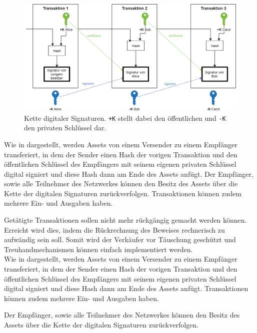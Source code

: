     \begin{figure}[!htb]
    	\centering
    	\includegraphics[width=\textwidth]{graphics/transaction.png}
    	\caption[Kette digitaler Signaturen]{Kette digitaler Signaturen\cite{Nakamoto2008}. \lstinline{+K} stellt dabei den öffentlichen und \lstinline{-K} den privaten Schlüssel dar.}
    	\label{fig:txio}
    \end{figure}
    Wie in  dargestellt, werden Assets von einem Versender zu einem Empfänger transferiert, in dem der Sender einen Hash der vorigen Transaktion und den öffentlichen Schlüssel des Empfängers mit seinem eigenen privaten Schlüssel digital signiert und diese Hash dann am Ende des Assets anfügt.
    Der Empfänger, sowie alle Teilnehmer des Netzwerkes können den Besitz des Assets über die Kette der digitalen Signaturen zurückverfolgen.
    Transaktionen können zudem mehrere Ein- und Ausgaben haben.\cite{Nakamoto2008}
    
    Getätigte Transaktionen sollen nicht mehr rückgängig gemacht werden können.
    Erreicht wird dies, indem die Rückrechnung des Beweises rechnerisch zu aufwändig sein soll\cite{Nakamoto2008}.
    Somit wird der Verkäufer vor Täuschung geschützt und Treuhandmechanismen können einfach implementiert werden\cite{Nakamoto2008}.  
    \medskip\\
    Wie in  dargestellt, werden Assets von einem Versender zu einem Empfänger transferiert, in dem der Sender einen Hash der vorigen Transaktion und den öffentlichen Schlüssel des Empfängers mit seinem eigenen privaten Schlüssel digital signiert und diese Hash dann am Ende des Assets anfügt.
    Transaktionen können zudem mehrere Ein- und Ausgaben haben\cite{Nakamoto2008}.
    
    Der Empfänger, sowie alle Teilnehmer des Netzwerkes können den Besitz des Assets über die Kette der digitalen Signaturen zurückverfolgen\cite{Nakamoto2008}.
	\FloatBarrier
	

